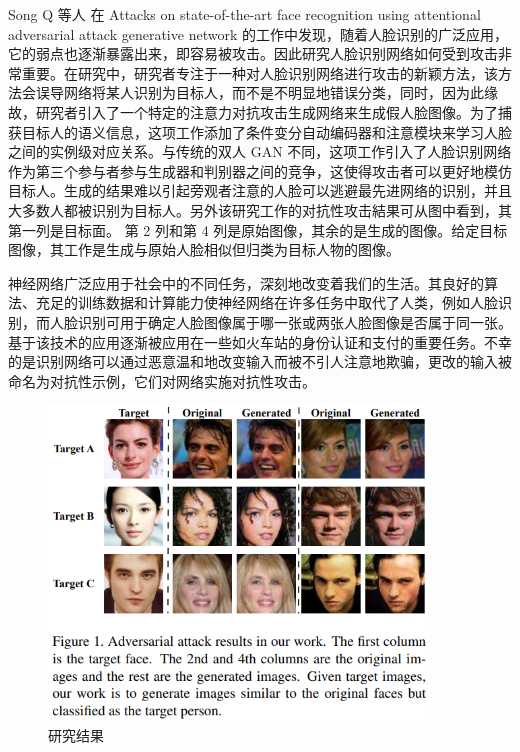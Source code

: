 Song Q 等人 \cite{yang2021attacks} 在 Attacks on state-of-the-art face recognition using attentional adversarial attack generative network 的工作中发现，随着人脸识别的广泛应用，它的弱点也逐渐暴露出来，即容易被攻击。因此研究人脸识别网络如何受到攻击非常重要。在研究中，研究者专注于一种对人脸识别网络进行攻击的新颖方法，该方法会误导网络将某人识别为目标人，而不是不明显地错误分类，同时，因为此缘故，研究者引入了一个特定的注意力对抗攻击生成网络来生成假人脸图像。为了捕获目标人的语义信息，这项工作添加了条件变分自动编码器和注意模块来学习人脸之间的实例级对应关系。与传统的双人 GAN 不同，这项工作引入了人脸识别网络作为第三个参与者参与生成器和判别器之间的竞争，这使得攻击者可以更好地模仿目标人。生成的结果难以引起旁观者注意的人脸可以逃避最先进网络的识别，并且大多数人都被识别为目标人。另外该研究工作的对抗性攻击結果可从图中看到，其第一列是目标面。 第 2 列和第 4 列是原始图像，其余的是生成的图像。给定目标图像，其工作是生成与原始人脸相似但归类为目标人物的图像。

神经网络广泛应用于社会中的不同任务，深刻地改变着我们的生活。其良好的算法、充足的训练数据和计算能力使神经网络在许多任务中取代了人类，例如人脸识别，而人脸识别可用于确定人脸图像属于哪一张或两张人脸图像是否属于同一张。基于该技术的应用逐渐被应用在一些如火车站的身份认证和支付的重要任务。不幸的是识别网络可以通过恶意温和地改变输入而被不引人注意地欺骗，更改的输入被命名为对抗性示例，它们对网络实施对抗性攻击。

\begin{figure}[htb]
\centering 
\includegraphics[width=0.90\textwidth]{img/p5m1.png} 
\caption{研究结果}
\label{Test}
\end{figure}

